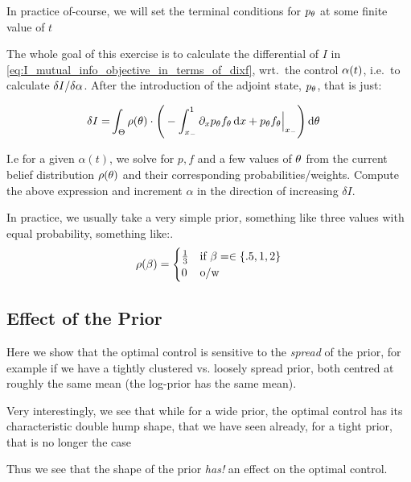 In practice of-course, we will set the terminal conditions for $p_{ \theta}$ at some
finite value of $t$

\vskip10pt The whole goal of this exercise is to calculate the differential of
$I$ in \cref{eq:I_mutual_info_objective_in_terms_of_dixf},
wrt.\ the control $\alpha(t)$, i.e.\ to calculate $\delta I / \delta \alpha$. After the
introduction of the adjoint state, $p_{ \theta}$, that is just:

 
\begin{align*}
\delta I =&   
\int_\Theta  \rho({ \theta}) \cdot \Bigg(  
- \int_{ x_{-} }^{1} {\partial}_x p_{ \theta} f_{ \theta} \, \mathrm{d} x + 
   p_{ \theta} f_{ \theta} \Big|_{ x_{-} } 
    \Bigg) \, \mathrm{d} { \theta}
\end{align*}

I.e for a given $\alpha(t)$, we solve for $p,f$ and a few values of ${ \theta}$ from
the current belief distribution $\rho({ \theta})$ and their corresponding
probabilities/weights. Compute the above expression and increment $\alpha$ in
the direction of increasing $\delta I$.

In practice, we usually take a very simple prior, something like three values
with equal probability, something like:.
\begin{equation}
\rho(\beta) = 
\begin{cases}
	\tfrac 13 & \textrm{if } \beta= \in \{.5,    1 ,  2 \}\\
	0   &\textrm{o/w }
\end{cases}
\label{eq:basic_prior_over_tau}
\end{equation} 

\subsection{Effect of the Prior}

Here we show that the optimal control is sensitive to the {\sl spread} of the
prior, for example if we have a tightly clustered vs. loosely spread prior, both
centred at roughly the same mean (the log-prior has the same mean). 

Very interestingly, we see that while for a wide prior, the optimal control has
its characteristic double hump shape, that we have seen already, for a tight
prior, that is no longer the case

Thus we see that the shape of the prior {\sl has!}
an effect on the optimal control.

